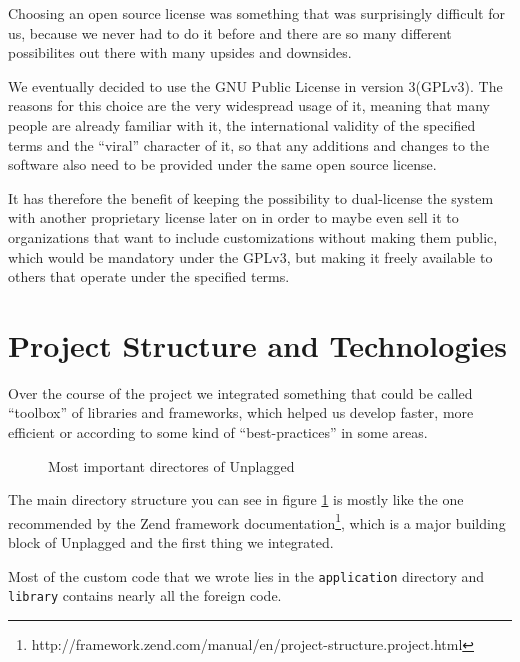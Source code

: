 Choosing an open source license was something that was surprisingly difficult for us,
because we never had to do it before and there are so many different possibilites out there with many upsides and downsides.

We eventually decided to use the GNU Public License in version 3(GPLv3). The reasons for this choice are the very widespread usage of it, meaning that many people are already 
familiar with it, the international validity of the specified terms and the \enquote{viral}
character of it, so that any additions and changes to the software also need to be provided 
under the same open source license.

It has therefore the benefit of keeping the possibility to dual-license the system with another proprietary license later on in order to maybe even sell it to organizations that want to include
customizations without making them public, which would be mandatory under the GPLv3, but making it freely available to others that operate under the specified terms.

\section{Project Structure and Technologies}

Over the course of the project we integrated something that could be called \enquote{toolbox} of libraries and frameworks, which 
helped us develop faster, more efficient or according to some kind of \enquote{best-practices}
in some areas.

\begin{figure}[!h]
\caption{Most important directores of Unplagged}
  \label{fig:directoryStructure}
\end{figure}

The main directory structure you can see in figure \ref{fig:directoryStructure} is mostly like the one recommended by the Zend framework documentation\footnote{http://framework.zend.com/manual/en/project-structure.project.html}, which is a major building block of 
Unplagged and the first thing we integrated.

Most of the custom code that we wrote lies in the \texttt{application} directory and \texttt{library} contains nearly all the foreign code.

